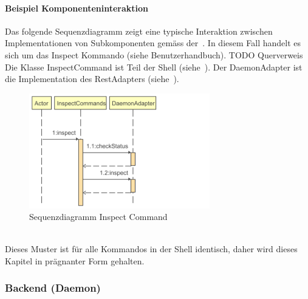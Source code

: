 \documentclass[a4paper,12pt]{report}
\begin{document}
    \paragraph*{Beispiel Komponenteninteraktion}
    Das folgende Sequenzdiagramm zeigt eine typische Interaktion zwischen Implementationen von Subkomponenten gemäss der~.
    In diesem Fall handelt es sich um das Inspect Kommando (siehe Benutzerhandbuch). TODO Querverweis
    Die Klasse InspectCommand ist Teil der Shell (siehe~). Der DaemonAdapter ist die Implementation des RestAdapters (siehe~).
    \begin{figure}[h]
        \centering
        \includegraphics[width=0.7\textwidth]{assets/InspectCommands_inspect_seq_diag}
        \caption{Sequenzdiagramm Inspect Command}
        \label{fig:seq-diag-inspect-commands}
    \end{figure}
    \\Dieses Muster ist für alle Kommandos in der Shell identisch, daher wird dieses Kapitel in prägnanter Form gehalten.

    \subsubsection{Backend (Daemon)}
\end{document}
